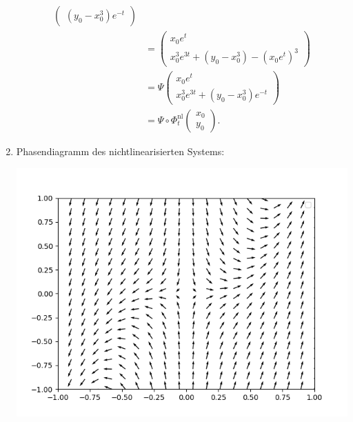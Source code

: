 \documentclass{article}
\begin{document}
\begin{enumerate}
\begin{align*}
\begin{pmatrix}
        (y_0 - x_0^3)e^{-t}
    \end{pmatrix}\\
    &= \begin{pmatrix}
        x_0e^t\\
        x_0^3e^{3t} + (y_0 - x_0^3) - (x_0e^t)^3
    \end{pmatrix}\\
    &= \Psi \begin{pmatrix}
        x_0e^t\\
        x_0^3e^{3t} + (y_0 - x_0^3)e^{-t}
    \end{pmatrix}\\
    &= \Psi \circ \Phi_t^\mathrm{nl} \begin{pmatrix}
        x_0\\y_0
    \end{pmatrix}.
\end{align*}
\item Phasendiagramm des nichtlinearisierten Systems: \begin{center}
    \includegraphics{figure_07_2.png}
\end{center}
\end{enumerate}
\end{document}
